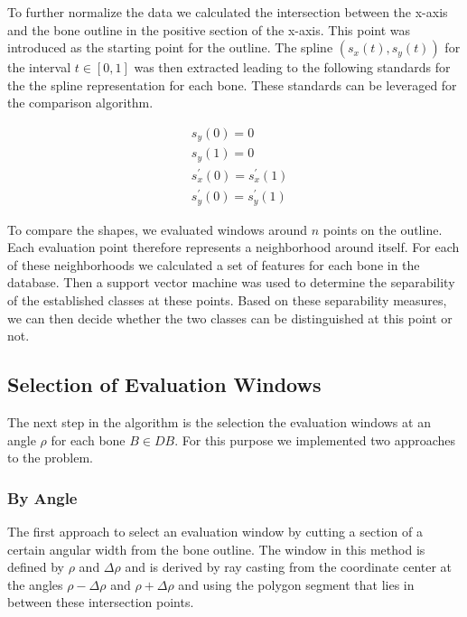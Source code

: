 \documentclass[pdftex,12pt,a4paper]{report}
\begin{document}
To further normalize the data we calculated the intersection between the x-axis and the bone outline
in the positive section of the x-axis. This point was introduced as the starting point for the outline.
The spline $(s_x(t), s_y(t))$ for the interval $t \in [0, 1]$ was then extracted leading to the
following standards for the the spline representation for each bone. These standards can be leveraged for the comparison algorithm.

\begin{equation}
\begin{split}
& s_y(0) = 0 \\
& s_y(1) = 0 \\
& s_x^\prime(0) = s_x^\prime(1) \\
& s_y^\prime(0) = s_y^\prime(1)
\end{split}
\end{equation}

To compare the shapes, we evaluated windows around $n$ points on the outline. Each evaluation
point therefore represents a neighborhood around itself. For each of these neighborhoods
we calculated a set of features for each bone in the database. Then a support vector machine
was used to determine the separability of the established classes at these points. Based on 
these separability measures, we can then decide whether the two classes can be distinguished
at this point or not. 

\subsection{Selection of Evaluation Windows}

The next step in the algorithm is the selection the evaluation windows at an angle $\rho$ for
each bone $B \in DB$. For this purpose we implemented two approaches to the problem.

\subsubsection{By Angle}
\label{subsub:windowbyangle}

The first approach to select an evaluation window by cutting a section of a certain angular
width from the bone outline. The window in this method is defined by $\rho$ and $\Delta\rho$
and is derived by ray casting from the coordinate center at the angles $\rho - \Delta\rho$ and 
$\rho + \Delta\rho$ and using the polygon segment that lies in between these intersection points. 
\end{document}

